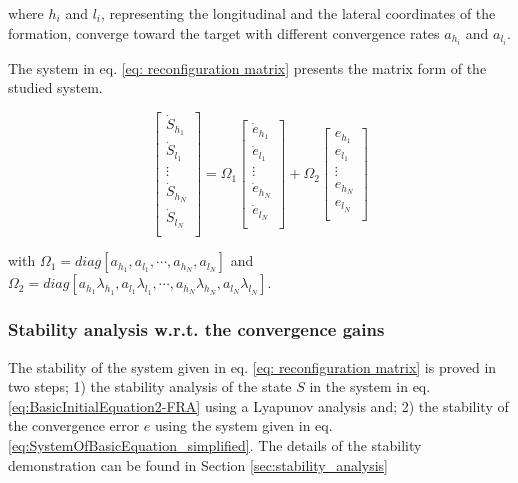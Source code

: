 \noindent where $h_i$ and $l_i$, representing the longitudinal and the lateral coordinates of the formation, converge toward the target with different convergence rates $a_{h_i}$ and $a_{l_i}$. 

The system in eq. \ref{eq: reconfiguration matrix} presents the matrix form of the studied system.


\begin{equation}\label{eq: reconfiguration matrix}
\begin{bmatrix} 
\dot{S}_{h_{1}} \\
\dot{S}_{l_{1}} \\
\vdots \\
\dot{S}_{h_{N}} \\
\dot{S}_{l_{N}} \\
\end{bmatrix}= 
 \Omega_{1}
  \begin{bmatrix} 
\dot{e}_{h_{1}} \\
\dot{e}_{l_{1}} \\
\vdots \\
\dot{e}_{h_{N}} \\
\dot{e}_{l_{N}} \\
\end{bmatrix}+
\Omega_{2}
  \begin{bmatrix} 
 {e}_{h_{1}} \\
{e}_{l_{1}} \\
\vdots \\
{e}_{h_{N}} \\
{e}_{l_{N}} \\
\end{bmatrix}
\end{equation}


\noindent with $\Omega_{1}=diag[a_{h_{1}},a_{l_{1}},\cdots,a_{h_{N}},a_{l_{N}}]$ and   \\ $\Omega_{2}=diag[a_{h_{1}}\lambda_{h_{1}},a_{l_{1}}\lambda_{l_{1}},\cdots,a_{h_{N}}\lambda_{h_{N}},a_{l_{N}}\lambda_{l_{N}}]$.

\subsubsection*{Stability analysis w.r.t. the convergence gains}
The stability of the system given in eq. \ref{eq: reconfiguration matrix} is proved in two steps; 1) the stability analysis of the state $S$ in the system in eq. \ref{eq:BasicInitialEquation2-FRA} using a Lyapunov analysis %
and; 2) the stability of the convergence error $e$ using the system given in eq. \ref{eq:SystemOfBasicEquation_simplified}. The details of the stability demonstration can be found in Section \ref{sec:stability_analysis}

